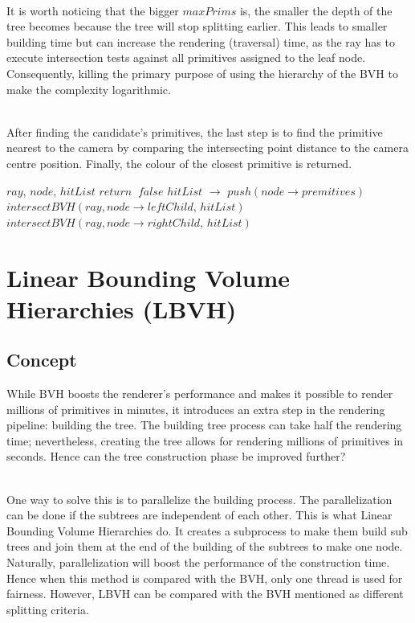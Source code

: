\documentclass[11pt,a4paper]{article}
\begin{document}
\noindent
\\
It is worth noticing that the bigger $maxPrims$ is, the smaller the depth of the tree becomes because the tree will stop splitting earlier. This leads to smaller building time but can increase the rendering (traversal) time, as the ray has to execute intersection tests against all primitives assigned to the leaf node. Consequently, killing the primary purpose of using the hierarchy of the BVH to make the complexity logarithmic.


\noindent
\\
After finding the candidate's primitives, the last step is to find the primitive nearest to the camera by comparing the intersecting point distance to the camera centre position. Finally, the colour of the closest primitive is returned.

\begin{algorithm}[H]
	\caption{$intersectBVH$}\label{alg:alg1}
	\begin{algorithmic}
		\Require $ray$, $node$, $hitList$
			\State $return\;\;false$
		\EndIf
		    \State $hitList$ $\rightarrow$ $push(node \rightarrow premitives)$
		\Else
			\State $intersectBVH(ray, node \rightarrow leftChild,\, hitList)$
			\State $intersectBVH(ray, node \rightarrow rightChild,\, hitList)$
		\EndIf
	\end{algorithmic}
\end{algorithm}

\clearpage

\section{Linear Bounding Volume Hierarchies (LBVH)}
\subsection{Concept}
While BVH boosts the renderer's performance and makes it possible to render millions of primitives in minutes, it introduces an extra step in the rendering pipeline: building the tree. The building tree process can take half the rendering time; nevertheless, creating the tree allows for rendering millions of primitives in seconds. Hence can the tree construction phase be improved further?

\noindent
\\
One way to solve this is to parallelize the building process. The parallelization can be done if the subtrees are independent of each other. This is what Linear Bounding Volume Hierarchies do. It creates a subprocess to make them build sub trees and join them at the end of the building of the subtrees to make one node. Naturally, parallelization will boost the performance of the construction time. Hence when this method is compared with the BVH, only one thread is used for fairness. However, LBVH can be compared with the BVH mentioned as different splitting criteria.
\end{document}
